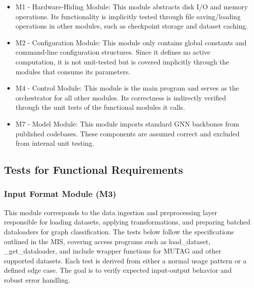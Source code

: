 \documentclass[12pt, titlepage]{article}
\begin{document}
\begin{itemize}
  \item M1 - Hardware-Hiding Module: This module abstracts disk I/O and memory operations. Its functionality is implicitly tested through file saving/loading operations in other modules, such as checkpoint storage and dataset caching.
  
  \item M2 - Configuration Module: This module only contains global constants and command-line configuration structures. Since it defines no active computation, it is not unit-tested but is covered implicitly through the modules that consume its parameters.
  
  \item M4 - Control Module: This module is the main program and serves as the orchestrator for all other modules. Its correctness is indirectly verified through the unit tests of the functional modules it calls.
  
  \item M7 - Model Module: This module imports standard GNN backbones from published codebases. These components are assumed correct and excluded from internal unit testing.
\end{itemize}




\subsection{Tests for Functional Requirements}
\label{sub:unit FR}

\subsubsection{Input Format Module (M3)}

This module corresponds to the data ingestion and preprocessing layer responsible for loading datasets, applying transformations, and preparing batched dataloaders for graph classification. The tests below follow the specifications outlined in the MIS, covering access programs such as load\_dataset, \_get\_dataloader, and include wrapper functions for MUTAG and other supported datasets. Each test is derived from either a normal usage pattern or a defined edge case. The goal is to verify expected input-output behavior and robust error handling.
\end{document}
